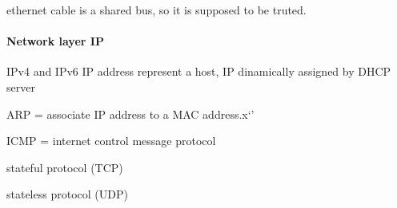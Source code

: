 \documentclass[11pt]{article}
\begin{document}
ethernet cable is a shared bus, so it is supposed to be truted.


\paragraph{Network layer IP} %
\label{par:network_layer_ip}
IPv4 and IPv6
IP address represent a host, IP dinamically assigned by DHCP server

ARP = associate IP address to a MAC address.x`'

ICMP = internet control message protocol


stateful protocol (TCP)

stateless protocol (UDP)
\end{document}
